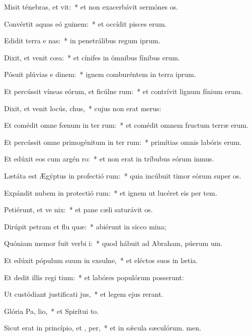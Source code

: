 \item Misit ténebras, et vit:~* et non exacerbávit sermónes os.
\item Convértit aquas eó  guinem:~* et occídit pisces erum.
\item Edidit terra e nas:~* in penetrálibus regum iprum.
\item Dixit, et venit cœa:~* et cínifes in ómnibus fínibus erum.
\item Pósuit plúvias e dinem:~* ignem comburéntem in terra iprum.
\item Et percússit víneas eórum, et ficúlne rum:~* et contrívit lignum fínium erum.
\item Dixit, et venit locús,  chus,~* cujus non erat merus:
\item Et comédit omne fœnum in ter rum:~* et comédit omnem fructum terræ erum.
\item Et percússit omne primogénitum in ter rum:~* primítias omnis labóris erum.
\item Et edúxit eos cum argén  ro:~* et non erat in tríbubus eórum inmus.
\item Lætáta est Ægýptus in profectió rum:~* quia incúbuit timor eórum super os.
\item Expándit nubem in protectió rum:~* et ignem ut lucéret eis per tem.
\item Petiérunt, et ve nix:~* et pane cæli saturávit os.
\item Dirúpit petram et flu quæ:~* abiérunt in sicco mina;
\item Quóniam memor fuit verbi  i:~* quod hábuit ad Abraham, púerum um.
\item Et edúxit pópulum suum in exsulne,~* et eléctos suos in lætia.
\item Et dedit illis regi tium:~* et labóres populórum posserunt:
\item Ut custódiant justificati jus,~* et legem ejus rerant.
\item Glória Pa,  lio,~* et Spirítui to.
\item Sicut erat in princípio, et ,  per,~* et in sǽcula sæculórum. men.
